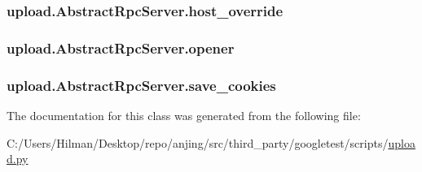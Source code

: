 \subsubsection[{host\+\_\+override}]{\setlength{\rightskip}{0pt plus 5cm}upload.\+Abstract\+Rpc\+Server.\+host\+\_\+override}\label{classupload_1_1_abstract_rpc_server_a783a4a7e4ffb776a57a3f267300a213b}
\hypertarget{classupload_1_1_abstract_rpc_server_aa931446476e0e86f3ade7fef0a0aea5a}{}
\subsubsection[{opener}]{\setlength{\rightskip}{0pt plus 5cm}upload.\+Abstract\+Rpc\+Server.\+opener}\label{classupload_1_1_abstract_rpc_server_aa931446476e0e86f3ade7fef0a0aea5a}
\hypertarget{classupload_1_1_abstract_rpc_server_affe342205c4647d41b127f5a5634858b}{}
\subsubsection[{save\+\_\+cookies}]{\setlength{\rightskip}{0pt plus 5cm}upload.\+Abstract\+Rpc\+Server.\+save\+\_\+cookies}\label{classupload_1_1_abstract_rpc_server_affe342205c4647d41b127f5a5634858b}


The documentation for this class was generated from the following file\+:\begin{DoxyCompactItemize}
\item 
C\+:/\+Users/\+Hilman/\+Desktop/repo/anjing/src/third\+\_\+party/googletest/scripts/\hyperlink{upload_8py}{upload.\+py}\end{DoxyCompactItemize}
